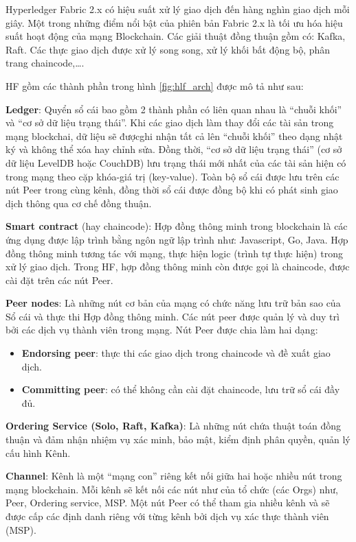Hyperledger Fabric 2.x có hiệu suất xử lý giao dịch đến hàng nghìn giao dịch mỗi giây. Một trong những điểm nổi bật của phiên bản Fabric 2.x là tối ưu hóa hiệu suất hoạt động của mạng Blockchain. Các giải thuật đồng thuận gồm có: Kafka, Raft. Các thực giao dịch được xử lý song song, xử lý khối bất động bộ, phân trang chaincode,\ldots.

HF gồm các thành phần trong hình \ref{fig:hlf_arch} được mô tả như sau:

\textbf{Ledger}: Quyển sổ cái bao gồm 2 thành phần có liên quan nhau là “chuỗi khối” và “cơ sở dữ liệu trạng thái”.
Khi các giao dịch làm thay đổi các tài sản trong mạng blockchai, dữ liệu sẽ đượcghi nhận tất cả lên “chuỗi khối” theo dạng nhật ký và không thể xóa hay chỉnh sửa. Đồng thời, “cơ sở dữ liệu trạng thái” (cơ sở dữ liệu LevelDB hoặc CouchDB) lưu trạng thái mới nhất của các tài sản hiện có trong mạng theo cặp khóa-giá trị (key-value).
Toàn bộ sổ cái được lưu trên các nút Peer trong cùng kênh, đồng thời sổ cái được đồng bộ khi có phát sinh giao dịch thông qua cơ chế đồng thuận.

\textbf{Smart contract} (hay chaincode): Hợp đồng thông minh trong blockchain là các ứng dụng được lập trình bằng ngôn ngữ lập trình như: Javascript, Go, Java. Hợp đồng thông minh tương tác với mạng, thực hiện logic (trình tự thực hiện) trong xử lý giao dịch.
Trong HF, hợp đồng thông minh còn được gọi là chaincode, được cài đặt trên các nút Peer.

\textbf{Peer nodes}: Là những nút cơ bản của mạng có chức năng lưu trữ bản sao của Sổ cái và thực thi Hợp đồng thông minh. Các nút peer được quản lý và duy trì bởi các dịch vụ thành viên trong mạng. Nút Peer được chia làm hai dạng:

\begin{itemize}
\item \textbf{Endorsing peer}: thực thi các giao dịch trong chaincode và đề xuất giao dịch.
\item \textbf{Committing peer}: có thể không cần cài đặt chaincode, lưu trữ sổ cái đầy đủ.
\end{itemize}

\textbf{Ordering Service (Solo, Raft, Kafka)}: Là những nút chứa thuật toán đồng thuận và đảm nhận nhiệm vụ xác minh, bảo mật, kiểm định phân quyền, quản lý cấu hình Kênh.

\textbf{Channel}: Kênh là một “mạng con” riêng kết nối giữa hai hoặc nhiều nút trong mạng blockchain. Mỗi kênh sẽ kết nối các nút như của tổ chức (các Orgs) như, Peer, Ordering service, MSP. Một nút Peer có thể tham gia nhiều kênh và sẽ được cấp các định danh riêng với từng kênh bởi dịch vụ xác thực thành viên (MSP).

